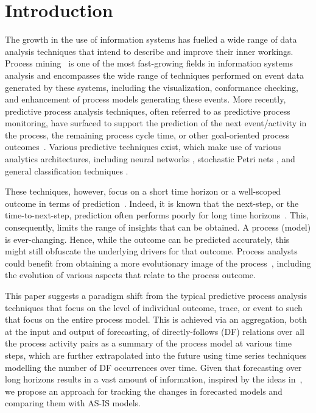 \section{Introduction}\label{sec:introduction}

The growth in the use of information systems has fuelled a wide range of data analysis techniques that intend to describe and improve their inner workings.
Process mining~\cite{van2016data} is one of the most fast-growing fields in information systems analysis and encompasses the wide range of techniques performed on event data generated by these systems, including the visualization, conformance checking, and enhancement of process models generating these events.
More recently, predictive process analysis techniques, often referred to as predictive process monitoring, have surfaced to support the prediction of the next event/activity in the process, the remaining process cycle time, or other goal-oriented process outcomes~\cite{DBLP:conf/bpm/Francescomarino18}.
Various predictive techniques exist, which make use of various analytics architectures, including neural networks \cite{DBLP:conf/caise/TaxVRD17}, stochastic Petri nets \cite{DBLP:conf/icsoc/Rogge-SoltiW13}, and general classification techniques \cite{DBLP:journals/tkdd/TeinemaaDRM19}.

These techniques, however, focus on a short time horizon or a well-scoped outcome in terms of prediction~\cite{DBLP:journals/tkdd/TeinemaaDRM19}.
Indeed, it is known that the next-step, or the time-to-next-step, prediction often performs poorly for long time horizons~\cite{park2020predicting}.
This, consequently, limits the range of insights that can be obtained. 
A process (model) is ever-changing. Hence, while the outcome can be predicted accurately, this might still obfuscate the underlying drivers for that outcome.
Process analysts could benefit from obtaining a more evolutionary image of the process~\cite{DBLP:conf/bpm/PollPRRR18}, including the evolution of various aspects that relate to the process outcome. 

This paper suggests a paradigm shift from the typical predictive process analysis techniques that focus on the level of individual outcome, trace, or event to such that focus on the entire process model.
This is achieved via an aggregation, both at the input and output of forecasting, of directly-follows (DF) relations over all the process activity pairs as a summary of the process model at various time steps, which are further extrapolated into the future using time series techniques modelling the number of DF occurrences over time.
Given that forecasting over long horizons results in a vast amount of information, inspired by the ideas in~\cite{DBLP:conf/er/KabicherKR11}, we propose an approach for tracking the changes in forecasted models and comparing them with AS-IS models.

